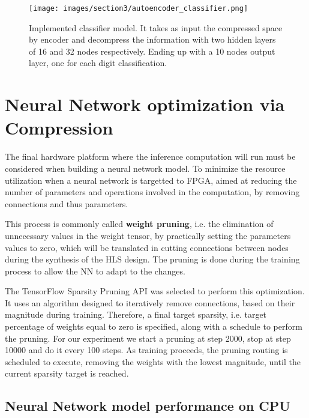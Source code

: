 \documentclass{article}
\begin{document}
\begin{figure}[H]
  \centering
  \texttt{[image: images/section3/autoencoder\_classifier.png]}
  \caption{Implemented classifier model. It takes as input the compressed space by encoder
  and decompress the information with two hidden layers of 16 and 32 nodes respectively. 
  Ending up with a 10 nodes output layer, one for each digit classification.}
  \label{fig:classifier}
  \end{figure}

\section{Neural Network optimization via Compression}

The final hardware platform where the inference computation will run must be considered when building a neural network model. 
To minimize the resource utilization when a neural network is targetted to FPGA, 
aimed at reducing the number of parameters and operations involved in the computation, 
by removing connections and thus parameters.

\par This process is commonly called \textbf{weight pruning}, i.e. the elimination of unnecessary values in the weight tensor, 
by practically setting the parameters values to zero, which will be translated in cutting connections between nodes 
during the synthesis of the HLS design. 
The pruning is done during the training process to allow the NN to adapt to the changes.

\par The TensorFlow Sparsity Pruning API was selected to perform this optimization.
It uses an algorithm designed to iteratively remove connections, based on their magnitude during training.
Therefore, a final target sparsity, i.e. target percentage of weights equal to zero is specified,
along with a schedule to perform the pruning. 
For our experiment we start a pruning at step 2000, stop at step 10000 and do it every 100 steps.
As training proceeds, the pruning routing is scheduled to execute, removing the weights with the lowest magnitude, 
until the current sparsity target is reached.

\subsection{Neural Network model performance on CPU}
\end{document}
